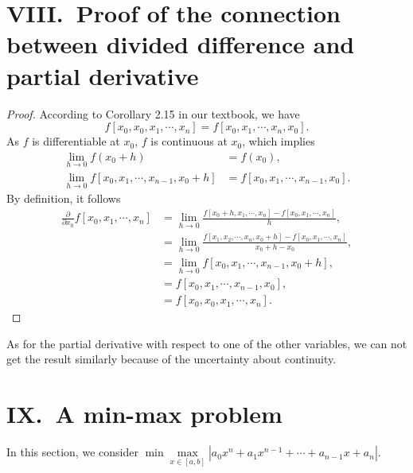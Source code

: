 \documentclass[a4paper]{article}
\begin{document}
\section*{VIII.\ Proof of the connection between divided difference and partial derivative}

\begin{proof}
  According to Corollary 2.15 in our textbook, we have 
  \begin{equation}
    f[x_0, x_0, x_1, \cdots, x_n] = f[x_0, x_1, \cdots, x_n, x_0].
    \label{eq:viii_corollary}
  \end{equation}
  As $f$ is differentiable at $x_0$, $f$ is continuous at $x_0$, which implies
  \begin{equation}
    \begin{aligned}
      \lim_{h \to 0} f(x_0 + h) &= f(x_0), \\
      \lim_{h \to 0} f[x_0, x_1, \cdots, x_{n - 1}, x_0 + h] &= f[x_0, x_1, \cdots, x_{n - 1}, x_0].
    \end{aligned}
    \label{eq:viii_continuous}
  \end{equation}
  By definition, it follows 
  \begin{equation}
    \begin{aligned}
      \frac{\partial}{\partial x_0} f[x_0, x_1, \cdots, x_n] &= \lim_{h \to 0} \frac{f[x_0 + h, x_1, \cdots, x_n] - f[x_0, x_1, \cdots, x_n]}{h}, \\
      &= \lim_{h \to 0} \frac{f[x_1, x_2, \cdots, x_n, x_0 + h] - f[x_0, x_1, \cdots, x_n]}{x_0 + h - x_0}, \\
      &= \lim_{h \to 0} f[x_0, x_1, \cdots, x_{n - 1}, x_0 + h], \\
      &= f[x_0, x_1, \cdots, x_{n - 1}, x_0], \\
      &= f[x_0, x_0, x_1, \cdots, x_n].
    \end{aligned}
    \label{eq:viii_partial_derivative}
  \end{equation}
\end{proof}

As for the partial derivative with respect to one of the other variables, we can not get the result similarly because of the uncertainty about continuity.

\section*{IX.\ A min-max problem}

In this section, we consider $\min \max\limits_{x \in [a, b]} |a_0 x^n + a_1 x^{n-1} + \cdots + a_{n-1} x + a_n|$.
\end{document}
